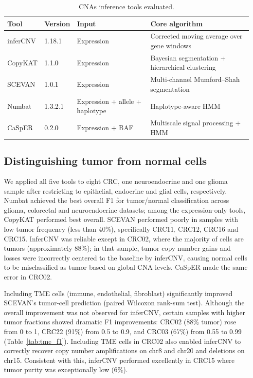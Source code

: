 \documentclass[11pt]{article}
\begin{document}
\begin{table}[ht]
\centering
\caption{CNAs inference tools evaluated.}
\label{tab:tools}
\begin{tabular}{llll}
\toprule
Tool & Version & Input & Core algorithm \\
\midrule
inferCNV & 1.18.1  & Expression                    & Corrected moving average over gene windows \\
CopyKAT  & 1.1.0   & Expression                    & Bayesian segmentation + hierarchical clustering \\
SCEVAN   & 1.0.1   & Expression                    & Multi-channel Mumford--Shah segmentation \\
Numbat   & 1.3.2.1 & Expression + allele + haplotype & Haplotype-aware HMM \\
CaSpER   & 0.2.0   & Expression + BAF              & Multiscale signal processing + HMM \\
\bottomrule
\end{tabular}
\end{table}

\subsection{Distinguishing tumor from normal cells}
We applied all five tools to eight CRC, one neuroendocrine and one glioma sample after restricting to epithelial, endocrine and glial cells, respectively. Numbat achieved the best overall F1 for tumor/normal classification across glioma, colorectal and neuroendocrine datasets; among the expression-only tools, CopyKAT performed best overall. SCEVAN performed poorly in samples with low tumor frequency (less than 40\%), specifically CRC11, CRC12, CRC16 and CRC15. InferCNV was reliable except in CRC02, where the majority of cells are tumors (approximately 88\%); in that sample, tumor copy number gains and losses were incorrectly centered to the baseline by inferCNV, causing normal cells to be misclassified as tumor based on global CNA levels. CaSpER made the same error in CRC02.

Including TME cells (immune, endothelial, fibroblast) significantly improved SCEVAN's tumor-cell prediction (paired Wilcoxon rank-sum test). Although the overall improvement was not observed for inferCNV, certain samples with higher tumor fractions showed dramatic F1 improvements: CRC02 (88\% tumor) rose from 0 to 1, CRC22 (91\%) from 0.5 to 0.9, and CRC03 (67\%) from 0.55 to 0.99 (Table~\ref{tab:tme_f1}). Including TME cells in CRC02 also enabled inferCNV to correctly recover copy number amplifications on chr8 and chr20 and deletions on chr15. Consistent with this, inferCNV performed excellently in CRC15 where tumor purity was exceptionally low (6\%).
\end{document}
